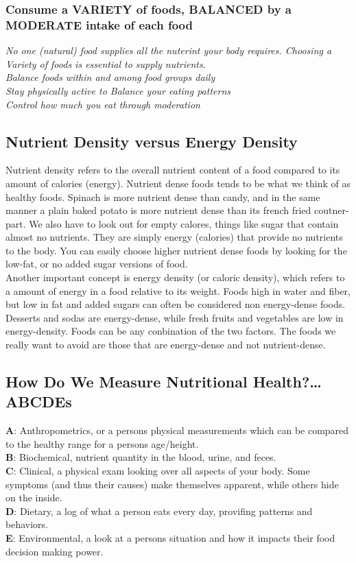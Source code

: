 \documentclass[letterpaper, 11pt]{article}
\begin{document}
\subsubsection{Consume a VARIETY of foods, BALANCED by a MODERATE intake of each food}
\label{sec:org26ef952}
\emph{No one (natural) food supplies all the nuterint your body requires. Choosing a Variety of foods is essential to supply nutrients.}\\
\emph{Balance foods within and among food groups daily}\\
\emph{Stay physically active to Balance your eating patterns}\\
\emph{Control how much you eat through moderation}\\
\subsection{Nutrient Density versus Energy Density}
\label{sec:org98e64bd}
Nutrient density refers to the overall nutrient content of a food compared to its amount of calories (energy). Nutrient dense foods tends to be what we think of as healthy foods. Spinach is more nutrient dense than candy, and in the same manner a plain baked potato is more nutrient dense than its french fried coutner-part. We also have to look out for empty calores, things like sugar that contain almost no nutrients. They are simply energy (calories) that provide no nutrients to the body. You can easily choose higher nutrient dense foods by looking for the low-fat, or no added sugar versions of food.\\
Another important concept is energy density (or caloric density), which refers to a amount of energy in a food relative to its weight. Foods high in water and fiber, but low in fat and added sugars can often be considered non energy-dense foods. Desserts and sodas are energy-dense, while fresh fruits and vegetables are low in energy-density. Foods can be any conbination of the two factors. The foods we really want to avoid are those that are energy-dense and not nutrient-dense.\\
\subsection{How Do We Measure Nutritional Health?\ldots{} ABCDEs}
\label{sec:org6276d37}
\textbf{A}: Anthropometrics, or a persons physical measurements which can be compared to the healthy range for a persons age/height.\\
\textbf{B}: Biochemical,  nutrient quantity in the blood, urine, and feces.\\
\textbf{C}: Clinical, a physical exam looking over all aspects of your body. Some symptoms (and thus their causes) make themselves apparent, while others hide on the inside.\\
\textbf{D}: Dietary, a log of what a person eats every day, provifing patterns and behaviors.\\
\textbf{E}: Environmental, a look at a persons situation and how it impacts their food decision making power.\\
\end{document}
